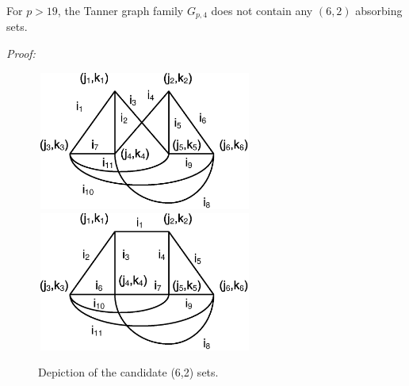 \begin{lemma}\label{Lem4} For $p>19$, the Tanner graph family $G_{p,4}$ does not contain any $(6,2)$ absorbing sets.
\end{lemma}

\noindent \textit{Proof:}
\begin{figure}
\center\includegraphics[width=2.8in,height=1.8in]{Drawing30_2.eps}
\center\includegraphics[width=2.8in,height=1.8in]{Drawing32_1.eps}\hspace{0.3in}
\caption{Depiction of the candidate (6,2) sets.} \label{fig62}
\end{figure}

